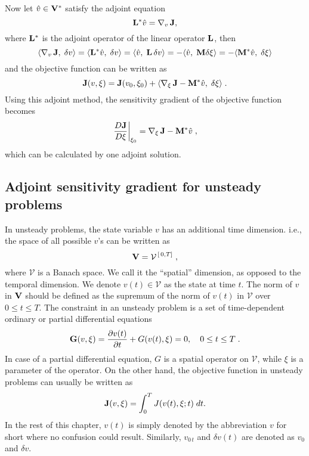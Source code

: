 Now let $\hat{v} \in {\bf V}^*$ satisfy the adjoint equation
$${\bf L}^* \hat{v} = \nabla_v\, {\bf J},$$
where $\bf L^*$ is the adjoint operator of the linear operator $\bf L$, then
$$ \langle\nabla_v\, {\bf J},\;\delta v\rangle
 = \langle {\bf L}^* \hat{v},\;\delta v\rangle
 = \langle \hat{v},\; {\bf L}\, \delta v\rangle
 = -\langle \hat{v},\; {\bf M} \delta \xi\rangle
 = -\langle {\bf M}^* \hat{v},\; \delta \xi\rangle $$
and the objective function can be written as
$$ {\bf J}(v,\xi) = {\bf J}(v_0,\xi_0)
 + \langle\nabla_{\xi}\, {\bf J} - {\bf M}^*\hat{v},\;\delta\xi\rangle \;.$$
Using this adjoint method, the sensitivity gradient of the objective
function becomes
\begin{equation} \label{sensitivity_steady}
  \left.\frac{D {\bf J}}{D\xi}\right|_{\xi_0}
 = \nabla_{\xi}\, {\bf J} - {\bf M}^*\hat{v} \;,
\end{equation}
which can be calculated by one adjoint solution.



\subsection{Adjoint sensitivity gradient for unsteady problems}
\label{s:adj_unsteady}

In unsteady problems, the state variable $v$ has an additional time dimension.
i.e., the space of all possible $v$'s can be written as
$$ {\bf V} = {\mathcal V}^{\,[\,0,T]} \;,$$
where $\mathcal V$ is a Banach space.  We call it the ``spatial'' dimension,
as opposed to the temporal dimension.
We denote $v(t) \in {\mathcal V}$ as the state at time $t$.
The norm of $v$ in $\bf V$ should be defined as the supremum of
the norm of $v(t)$ in $\mathcal V$ over $0\le t\le T$.
The constraint in an unsteady problem is a set of time-dependent ordinary or
partial differential equations
$$ {\bf G}(v,\xi) = \frac{\partial v(t)}{\partial t} + G(v(t),\xi) = 0, \quad
   0 \le t \le T \;.$$
In case of a partial differential equation, $G$ is a spatial operator on
$\mathcal V$, while $\xi$ is a parameter of the operator.  On the other
hand, the objective function in unsteady problems can usually be written as
$$ {\bf J}(v,\xi) = \int_0^T J(v(t),\xi;t) \;dt .$$
In the rest of this chapter, $v(t)$ is simply denoted by the abbreviation
$v$ for short where no confusion could result.  Similarly, $v_{0\,t}$
and $\delta v(t)$ are denoted as $v_0$ and $\delta v$.


